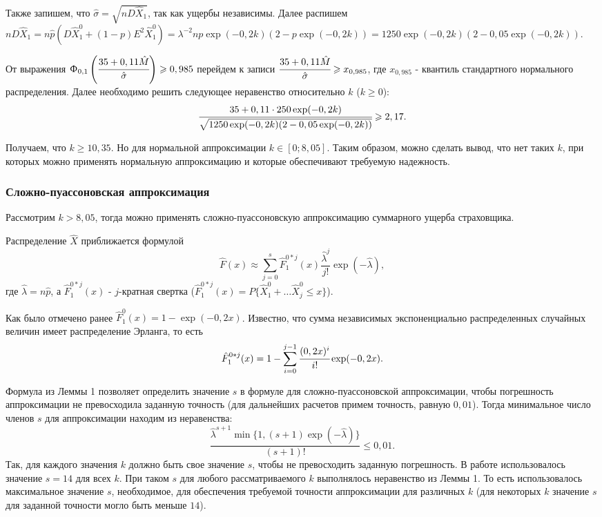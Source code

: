 \documentclass[a4paper,12pt]{article}
\begin{document}
Также запишем, что $\hat{\sigma} = \sqrt{n D\hat{X}_1}$, так как ущербы независимы.  Далее распишем $n D\hat{X}_1 = n\hat{p} (D\hat{X}_1^0 + (1-p)E^2\hat{X}_1^0) = \lambda^{-2}np\exp(-0,2k)(2 - p\exp(-0,2k)) = 1250 \exp(-0,2k)(2 - 0,05\exp(-0,2k))$. 

От выражения $\Upphi_{0, 1}\left(\cfrac{35 +0,11\hat{M}}{\hat{\sigma}}\right) \ge 0,985$ перейдем к записи $\cfrac{35 +0,11\hat{M}}{\hat{\sigma}} \ge x_{0,985}$, где $x_{0,985}$ - квантиль стандартного нормального распределения. Далее необходимо решить следующее неравенство относительно $k$ ($k \ge 0$):
\[\cfrac{35 + 0,11 \cdot 250 \exp(-0,2 k)}{\sqrt{1250 \exp(-0,2k)(2 - 0,05\exp(-0,2k))}} \ge 2,17.\]

Получаем, что $k \ge 10,35$. Но для нормальной аппроксимации $k \in [0; 8,05]$. Таким образом, можно сделать вывод, что нет таких $k$, при которых можно применять нормальную аппроксимацию и которые обеспечивают требуемую надежность.

\subsubsection{Сложно-пуассоновская аппроксимация}
Рассмотрим $k > 8,05$, тогда можно применять сложно-пуассоновскую аппроксимацию суммарного ущерба страховщика. 

Распределение $\hat{X}$ приближается формулой 
\[\hat{F}(x) \approx \sum_{j = 0}^{s} \hat{F}_1^{0 * j}(x) \frac{\hat{\lambda}^j}{j!}\exp (-\hat{\lambda}),\]
где $\hat{\lambda} = n\hat{p}$, а $\hat{F}_1^{0 * j}(x)$ - $j$-кратная свертка ($\hat{F}_1^{0 * j}(x) = P\{\hat{X}_1^0 + \dots \hat{X}_j^0 \le x\}$).

Как было отмечено ранее $\hat{F}_1^0(x) = 1 - \exp(-0,2 x)$. Известно, что сумма независимых экспоненциально распределенных случайных величин имеет распределение Эрланга, то есть
\[\hat{F}_1^{0 * j}(x) = 1 - \sum_{i = 0}^{j - 1} \cfrac{(0,2 x)^i}{i!} \exp(-0,2x).\]

Формула из Леммы 1 позволяет определить значение $s$ в формуле для сложно-пуассоновской аппроксимации, чтобы погрешность аппроксимации не превосходила заданную точность (для дальнейших расчетов примем точность, равную $0,01$). Тогда минимальное число членов $s$ для аппроксимации находим из неравенства:
\[\frac{\hat{\lambda}^{s + 1} \min\{1, (s + 1)\exp(-\hat{\lambda})\}}{(s + 1)!} \le 0,01.\]
Так, для каждого значения $k$ должно быть свое значение $s$, чтобы не превосходить заданную погрешность. В работе использовалось значение $s = 14$ для всех $k$. При таком $s$ для любого рассматриваемого $k$ выполнялось неравенство из Леммы 1. То есть использовалось максимальное значение $s$, необходимое, для обеспечения требуемой точности аппроксимации для различных $k$ (для некоторых $k$ значение $s$ для заданной точности могло быть меньше $14$).
\end{document}
